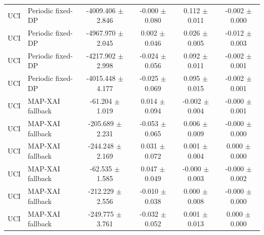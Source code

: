\begin{tabular}{llcccc}
UCI & Periodic fixed-DP & -4009.406 $\pm$ 2.846 & -0.000 $\pm$ 0.080 & 0.112 $\pm$ 0.011 & -0.002 $\pm$ 0.000 \\
UCI & Periodic fixed-DP & -4967.970 $\pm$ 2.045 & 0.002 $\pm$ 0.046 & 0.026 $\pm$ 0.005 & -0.012 $\pm$ 0.003 \\
UCI & Periodic fixed-DP & -4217.902 $\pm$ 2.998 & -0.024 $\pm$ 0.056 & 0.092 $\pm$ 0.011 & -0.002 $\pm$ 0.001 \\
UCI & Periodic fixed-DP & -4015.448 $\pm$ 4.177 & -0.025 $\pm$ 0.069 & 0.095 $\pm$ 0.015 & -0.002 $\pm$ 0.001 \\
UCI & MAP-XAI fallback & -61.204 $\pm$ 1.019 & 0.014 $\pm$ 0.094 & -0.002 $\pm$ 0.004 & -0.000 $\pm$ 0.001 \\
UCI & MAP-XAI fallback & -205.689 $\pm$ 2.231 & -0.053 $\pm$ 0.065 & 0.006 $\pm$ 0.009 & -0.000 $\pm$ 0.000 \\
UCI & MAP-XAI fallback & -244.248 $\pm$ 2.169 & 0.031 $\pm$ 0.072 & 0.001 $\pm$ 0.004 & 0.000 $\pm$ 0.000 \\
UCI & MAP-XAI fallback & -62.535 $\pm$ 1.585 & 0.047 $\pm$ 0.049 & -0.000 $\pm$ 0.003 & -0.000 $\pm$ 0.002 \\
UCI & MAP-XAI fallback & -212.229 $\pm$ 2.556 & -0.010 $\pm$ 0.038 & 0.000 $\pm$ 0.008 & -0.000 $\pm$ 0.000 \\
UCI & MAP-XAI fallback & -249.775 $\pm$ 3.761 & -0.032 $\pm$ 0.052 & 0.001 $\pm$ 0.013 & 0.000 $\pm$ 0.000 \\
\bottomrule
\end{tabular}
